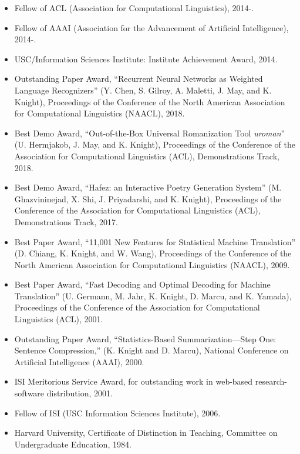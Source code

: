 \begin{itemize}

\item Fellow of ACL (Association for Computational Linguistics), 2014-.

\item Fellow of AAAI (Association for the Advancement 
of Artificial Intelligence), 2014-.

\item USC/Information Sciences Institute: Institute Achievement Award, 2014.

\item Outstanding Paper Award,
``Recurrent Neural Networks as Weighted Language Recognizers'' (Y. Chen, S. Gilroy, A. Maletti, J. May, and K. Knight), Proceedings of the Conference of the North American Association for Computational Linguistics (NAACL), 2018. 

\item Best Demo Award,
``Out-of-the-Box Universal Romanization Tool {\em uroman}'' (U. Hermjakob,
J. May, and K. Knight),
Proceedings of the Conference of the 
Association for Computational Linguistics (ACL), Demonstrations Track, 2018.

\item Best Demo Award,
``Hafez: an Interactive Poetry Generation System'' (M. Ghazvininejad, X. Shi, 
J. Priyadarshi, and K. Knight), 
Proceedings of the Conference of the 
Association for Computational Linguistics (ACL), Demonstrations Track, 2017.

\item Best Paper Award,
``11,001 New Features for Statistical Machine Translation''
(D. Chiang, K. Knight, and W. Wang),
Proceedings of the Conference of the 
North American Association for Computational Linguistics (NAACL), 2009.

\item Best Paper Award,
``Fast Decoding and Optimal Decoding for Machine Translation''
(U. Germann, M. Jahr, K. Knight, D. Marcu, and K. Yamada),
Proceedings of the Conference of the 
Association for Computational Linguistics (ACL), 2001.

\item Outstanding Paper Award, 
``Statistics-Based Summarization---Step One: Sentence Compression,'' 
(K. Knight and D. Marcu), National Conference on Artificial
Intelligence (AAAI), 2000.  

\item ISI Meritorious Service Award, for outstanding work in web-based 
research-software distribution, 2001.

\item Fellow of ISI (USC Information Sciences Institute), 2006.

\item Harvard University, Certificate of Distinction in Teaching, 
Committee on Undergraduate Education, 1984.

\end{itemize}

